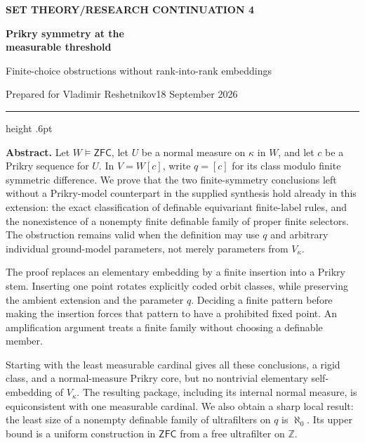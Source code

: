 \documentclass[11pt,letterpaper]{article}
\theoremstyle{definition}
\numberwithin{equation}{section}
\newcommand{\ZFC}{\mathsf{ZFC}}
\begin{document}
\thispagestyle{empty}
{\sffamily\bfseries\small\color{Olive}SET THEORY\quad /\quad RESEARCH CONTINUATION 4}

\vspace{13pt}
{\fontsize{28}{31}\selectfont\bfseries\color{Forest}Prikry symmetry at the\\ measurable threshold\par}
\vspace{10pt}
{\fontsize{14}{18}\selectfont Finite-choice obstructions without rank-into-rank embeddings\par}
\vspace{14pt}
{\color{Muted}Prepared for Vladimir Reshetnikov\hfill 18 September 2026\par}
\vspace{3pt}
{\color{Sage}\hrule height .6pt}
\vspace{12pt}

\textbf{Abstract.} Let $W\models\ZFC$, let $U$ be a normal measure on $\kappa$ in $W$, and let $c$ be a Prikry sequence for $U$. In $V=W[c]$, write $q=[c]$ for its class modulo finite symmetric difference. We prove that the two finite-symmetry conclusions left without a Prikry-model counterpart in the supplied synthesis hold already in this extension: the exact classification of definable equivariant finite-label rules, and the nonexistence of a nonempty finite definable family of proper finite selectors. The obstruction remains valid when the definition may use $q$ and arbitrary individual ground-model parameters, not merely parameters from $V_\kappa$.

The proof replaces an elementary embedding by a finite insertion into a Prikry stem. Inserting one point rotates explicitly coded orbit classes, while preserving the ambient extension and the parameter $q$. Deciding a finite pattern before making the insertion forces that pattern to have a prohibited fixed point. An amplification argument treats a finite family without choosing a definable member.

Starting with the least measurable cardinal gives all these conclusions, a rigid class, and a normal-measure Prikry core, but no nontrivial elementary self-embedding of $V_\kappa$. The resulting package, including its internal normal measure, is equiconsistent with one measurable cardinal. We also obtain a sharp local result: the least size of a nonempty definable family of ultrafilters on $q$ is $\aleph_0$. Its upper bound is a uniform construction in $\ZFC$ from a free ultrafilter on $\mathbb Z$.
\end{document}
